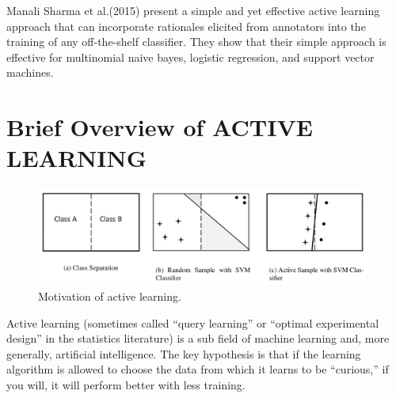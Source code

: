 \documentclass{acmtog}
\begin{document}
 Manali Sharma et al.(2015) present a simple and yet effective active learning approach that can incorporate rationales elicited from annotators into the training of any off-the-shelf classifier\cite{sharma:naaclhlt15}. They show that their simple approach is effective for multinomial naive bayes, logistic regression, and support vector machines. 


\section{Brief Overview of ACTIVE LEARNING}
\label{sec:brifoverview}
\begin{figure}[t]
\centerline{\includegraphics[width=11cm]{motivation}}
\caption{Motivation of active learning.}
  \label{fig:motivation}
\end{figure}
Active learning (sometimes called “query learning” or “optimal experimental design” in the statistics literature) is a sub field of machine learning and, more generally, artificial intelligence. The key hypothesis is that if the learning algorithm is allowed to choose the data from which it learns to be “curious,” if you will, it will perform better with less training. 
\end{document}

